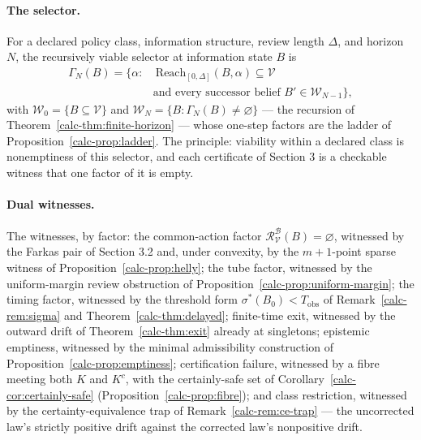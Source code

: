 \documentclass[10pt,twocolumn]{article}
\theoremstyle{definition}
\begin{document}
\paragraph{The selector.} For a declared policy class, information structure, review length \(\Delta\), and horizon \(N\), the recursively viable selector at information state \(B\) is
\[
\begin{split}
\Gamma_{N}(B) = \bigl\{\alpha :&\ \mathrm{Reach}_{[0,\Delta]}(B,\alpha) \subseteq \mathcal{V} \\
&\text{and every successor belief } B' \in \mathcal{W}_{N-1}\bigr\},
\end{split}
\]
with \(\mathcal{W}_{0} = \{B \subseteq \mathcal{V}\}\) and \(\mathcal{W}_{N} = \{B : \Gamma_{N}(B) \neq \varnothing\}\) --- the recursion of Theorem~\ref{calc-thm:finite-horizon} --- whose one-step factors are the ladder of Proposition~\ref{calc-prop:ladder}. The principle: viability within a declared class is nonemptiness of this selector, and each certificate of Section 3 is a checkable witness that one factor of it is empty.

\paragraph{Dual witnesses.} The witnesses, by factor: the common-action factor \(\mathcal{R}^{\mathcal{B}}_{\mathcal{V}}(B) = \varnothing\), witnessed by the Farkas pair of Section 3.2 and, under convexity, by the \(m+1\)-point sparse witness of Proposition~\ref{calc-prop:helly}; the tube factor, witnessed by the uniform-margin review obstruction of Proposition~\ref{calc-prop:uniform-margin}; the timing factor, witnessed by the threshold form \(\sigma^{*}(B_{0}) < T_{\mathrm{obs}}\) of Remark~\ref{calc-rem:sigma} and Theorem~\ref{calc-thm:delayed}; finite-time exit, witnessed by the outward drift of Theorem~\ref{calc-thm:exit} already at singletons; epistemic emptiness, witnessed by the minimal admissibility construction of Proposition~\ref{calc-prop:emptiness}; certification failure, witnessed by a fibre meeting both \(K\) and \(K^{c}\), with the certainly-safe set of Corollary~\ref{calc-cor:certainly-safe} (Proposition~\ref{calc-prop:fibre}); and class restriction, witnessed by the certainty-equivalence trap of Remark~\ref{calc-rem:ce-trap} --- the uncorrected law's strictly positive drift against the corrected law's nonpositive drift.
\end{document}
